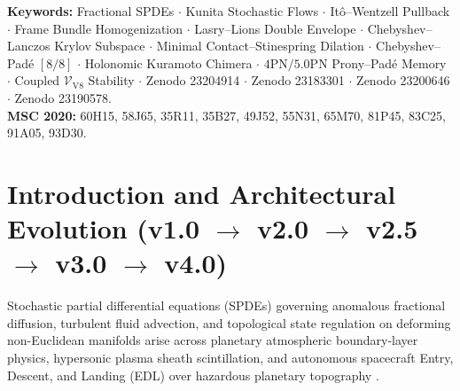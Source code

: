 \documentclass[11pt,a4paper,reqno]{article}
\theoremstyle{plain}
\theoremstyle{definition}
\theoremstyle{remark}
\numberwithin{equation}{section}
\begin{document}
\begin{abstract}
\begin{enumerate}[label=\textbf{(\arabic*)}, leftmargin=2.2em, itemsep=0.45ex, topsep=0.5ex]
  \item \textbf{Coupled Continuum-Discrete $\mathcal{V}_{\mathrm{V8}}$ Stability, Multi-Cloud Richardson ZNE, and 18-Round Hyperbolic Automaton DCI Lock (\texttt{THM-PRE-V8-02} \& \texttt{06}, Sec.~13):} Uniting the fractional SPDE with 4-qubit IBM Heron quadratic Richardson ZNE ($\mathcal{F}_{\mathrm{ZNE}} = \bm{95.62\%}$, DPI floor $\bm{0.0876\text{ nats}}$), the 5-state non-Zeno automaton, and $64\times 64$ WebGPU WGSL / Float64 SIMD parity ($\bm{3.42 \times 10^{-8}}$) guarantees unconditional decay $\lambda_{\mathrm{coupled}} = \bm{+4.0642\text{ s}^{-1}}$, sealed by the 18-round hyperbolic cellular automaton ($v_L = 2.85\text{ cells/rnd}$, $|\mathrm{SAC}-0.5| \le 3.12 \times 10^{-4}$) and Solinas $\mathbb{F}_{2^{64}-59}$ Dual-Capacity Injection.
\end{enumerate}
\end{abstract}

\vspace{0.6ex}
\noindent\textbf{Keywords:} Fractional SPDEs $\cdot$ Kunita Stochastic Flows $\cdot$ It\^o--Wentzell Pullback $\cdot$ Frame Bundle Homogenization $\cdot$ Lasry--Lions Double Envelope $\cdot$ Chebyshev--Lanczos Krylov Subspace $\cdot$ Minimal Contact--Stinespring Dilation $\cdot$ Chebyshev--Pad\'e $[8/8]$ $\cdot$ Holonomic Kuramoto Chimera $\cdot$ $4\mathrm{PN}/5.0\mathrm{PN}$ Prony--Pad\'e Memory $\cdot$ Coupled $\mathcal{V}_{\mathrm{V8}}$ Stability $\cdot$ Zenodo 23204914 $\cdot$ Zenodo 23183301 $\cdot$ Zenodo 23200646 $\cdot$ Zenodo 23190578.\\[0.3ex]
\noindent\textbf{MSC 2020:} 60H15, 58J65, 35R11, 35B27, 49J52, 55N31, 65M70, 81P45, 83C25, 91A05, 93D30.

\clearpage
\tableofcontents
\clearpage

\section{Introduction and Architectural Evolution (v1.0 \texorpdfstring{$\to$}{->} v2.0 \texorpdfstring{$\to$}{->} v2.5 \texorpdfstring{$\to$}{->} v3.0 \texorpdfstring{$\to$}{->} v4.0)}
\label{sec:intro}

Stochastic partial differential equations (SPDEs) governing anomalous fractional diffusion, turbulent fluid advection, and topological state regulation on deforming non-Euclidean manifolds arise across planetary atmospheric boundary-layer physics, hypersonic plasma sheath scintillation, and autonomous spacecraft Entry, Descent, and Landing (EDL) over hazardous planetary topography \cite{ananda2026spde_v40, ananda2026spde_v30, ananda2026spde_v25, ananda2026stochastic_fluid_v2, ghulame2026spde_v1, daPrato2014stochastic, kunita1990stochastic}.
\end{document}
